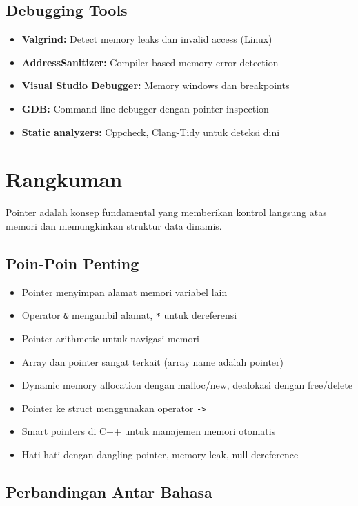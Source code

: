 \documentclass[../main.tex]{subfiles}
\begin{document}
\subsection{Debugging Tools}

\begin{itemize}
  \item \textbf{Valgrind:} Detect memory leaks dan invalid access (Linux)
  \item \textbf{AddressSanitizer:} Compiler-based memory error detection
  \item \textbf{Visual Studio Debugger:} Memory windows dan breakpoints
  \item \textbf{GDB:} Command-line debugger dengan pointer inspection
  \item \textbf{Static analyzers:} Cppcheck, Clang-Tidy untuk deteksi dini
\end{itemize}

\section{Rangkuman}

Pointer adalah konsep fundamental yang memberikan kontrol langsung atas memori dan memungkinkan struktur data dinamis.

\subsection{Poin-Poin Penting}

\begin{itemize}
  \item Pointer menyimpan alamat memori variabel lain
  \item Operator \texttt{\&} mengambil alamat, \texttt{*} untuk dereferensi
  \item Pointer arithmetic untuk navigasi memori
  \item Array dan pointer sangat terkait (array name adalah pointer)
  \item Dynamic memory allocation dengan malloc/new, dealokasi dengan free/delete
  \item Pointer ke struct menggunakan operator \texttt{->}
  \item Smart pointers di C++ untuk manajemen memori otomatis
  \item Hati-hati dengan dangling pointer, memory leak, null dereference
\end{itemize}

\subsection{Perbandingan Antar Bahasa}
\end{document}
